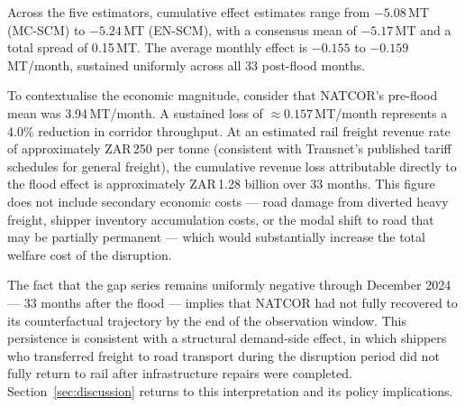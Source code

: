 Across the five estimators, cumulative effect estimates range from
$-5.08$\,MT (MC-SCM) to $-5.24$\,MT (EN-SCM), with a consensus mean
of $-5.17$\,MT and a total spread of 0.15\,MT.
The average monthly effect is $-0.155$ to $-0.159$\,MT/month,
sustained uniformly across all 33 post-flood months.

To contextualise the economic magnitude, consider that NATCOR's
pre-flood mean was 3.94\,MT/month.
A sustained loss of $\approx 0.157$\,MT/month represents a 4.0\%
reduction in corridor throughput.
At an estimated rail freight revenue rate of approximately
ZAR\,250 per tonne (consistent with Transnet's published tariff
schedules for general freight), the cumulative revenue loss attributable
directly to the flood effect is approximately
ZAR\,1.28 billion over 33 months.
This figure does not include secondary economic costs --- road damage
from diverted heavy freight, shipper inventory accumulation costs,
or the modal shift to road that may be partially permanent --- which
would substantially increase the total welfare cost of the disruption.

The fact that the gap series remains uniformly negative through
December 2024 --- 33 months after the flood --- implies that NATCOR
had not fully recovered to its counterfactual trajectory by the end
of the observation window.
This persistence is consistent with a structural demand-side effect,
in which shippers who transferred freight to road transport during the
disruption period did not fully return to rail after infrastructure
repairs were completed.
Section~\ref{sec:discussion} returns to this interpretation and its
policy implications.
